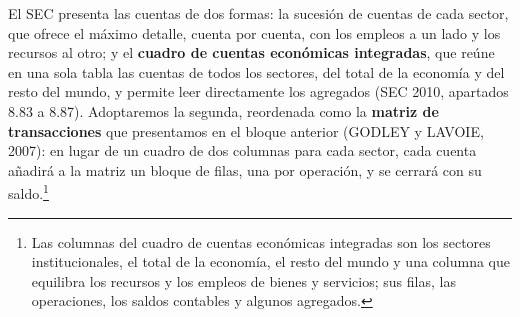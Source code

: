 \documentclass[10pt,a4paper]{article}
\begin{document}
El SEC presenta las cuentas de dos formas: la sucesión de cuentas de cada sector, que ofrece el máximo detalle, cuenta por cuenta, con los empleos a un lado y los recursos al otro; y el \textbf{cuadro de cuentas económicas integradas}, que reúne en una sola tabla las cuentas de todos los sectores, del total de la economía y del resto del mundo, y permite leer directamente los agregados (SEC 2010, apartados 8.83 a 8.87). Adoptaremos la segunda, reordenada como la \textbf{matriz de transacciones} que presentamos en el bloque anterior (GODLEY y LAVOIE, 2007): en lugar de un cuadro de dos columnas para cada sector, cada cuenta añadirá a la matriz un bloque de filas, una por operación, y se cerrará con su saldo.\footnote{%
    Las columnas del cuadro de cuentas económicas integradas son los sectores institucionales, el total de la economía, el resto del mundo y una columna que equilibra los recursos y los empleos de bienes y servicios; sus filas, las operaciones, los saldos contables y algunos agregados.

}
\end{document}
